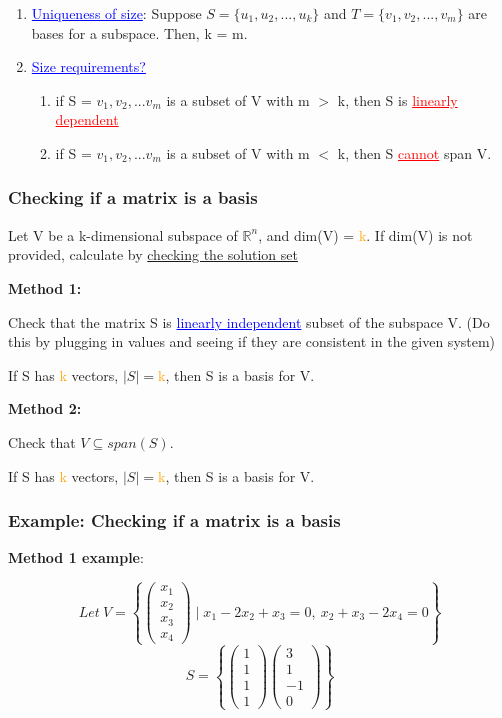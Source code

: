\documentclass{article}
\newcommand{\bul}[1]{\textcolor{blue}{\underline{#1}}}
\newcommand{\rul}[1]{\textcolor{red}{\underline{#1}}}
\newcommand{\sub}[1]{\vspace{10pt}\textbf{#1}}
\begin{document}
\begin{enumerate}
    \item \bul{Uniqueness of size}: Suppose $ S = \{u_1, u_2, ... , u_k\}$ and $T= \{v_1,v_2,...,v_m\}$ are bases for a subspace. Then, k = m.
    \item \bul{Size requirements?}
    \begin{enumerate}
        \item if S = {$v_1,v_2,...v_m$} is a subset of V with m $>$ k, then S is \rul{linearly dependent}
        \item if S = {$v_1,v_2,...v_m$} is a subset of V with m $<$ k, then S \rul{cannot} span V.
    \end{enumerate}
\end{enumerate}

\subsubsection{Checking if a matrix is a basis}
Let V be a k-dimensional subspace of $\mathbb{R}^n$, and dim(V) = \textcolor{orange}{k}. If dim(V) is not provided, calculate by \hyperref[sec:ubmtsme]{checking the solution set}

\sub{Method 1:}

Check that the matrix S is \bul{linearly independent} subset of the subspace V. (Do this by plugging in values and seeing if they are consistent in the given system)

If S has \textcolor{orange}{k} vectors, $\mid S\mid=$\textcolor{orange}{k}, then S is a basis for V.

\sub{Method 2:}

Check that $V \subseteq span(S)$.

If S has \textcolor{orange}{k} vectors, $\mid S\mid=$\textcolor{orange}{k}, then S is a basis for V.

\subsubsection{Example: Checking if a matrix is a basis}
\sub{Method 1 example}:

\[
    Let\ V = 
\left\{
\begin{pmatrix}
    x_1\\
    x_2\\
    x_3\\
    x_4
\end{pmatrix}\mid
x_1 - 2x_2 +x_3 = 0,\ x_2+x_3-2x_4 = 0
\right\}
\]
\[
S=
\left\{
\begin{pmatrix}
    1\\
    1\\
    1\\
    1
\end{pmatrix}
\begin{pmatrix}
    3\\
    1\\
    -1\\
    0
\end{pmatrix}
\right\}
\]
\end{document}

